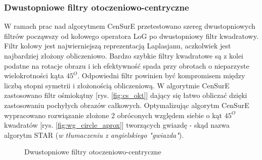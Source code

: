 \subsubsection{Dwustopniowe filtry otoczeniowo-centryczne}

W ramach prac nad algorytmem {CenSurE} przetestowano szereg dwustopniowych filtrów począwszy od kołowego operatora LoG po dwustopniowy filtr kwadratowy. Filtr kołowy jest najwierniejszą reprezentacją Laplasjanu, aczkolwiek jest najbardziej złożony obliczeniowo. Bardzo szybkie filtry kwadratowe są z kolei podatne na rotacje obrazu i ich efektywność spada przy obrotach o nieparzyste wielokrotności kąta $45^O$. Odpowiedni filtr powinien być kompromisem między liczbą stopni symetrii i złożonością obliczeniową. W algorytmie {CenSurE} zastosowano filtr ośmiokątny [rys. \ref{fig:cs_okt}] dający się łatwo obliczać dzięki zastosowaniu pochyłych obrazów całkowych. Optymalizując algorytm {CenSurE} wypracowano rozwiązanie złożone 2 obróconych względem siebie o kąt $45^O$ kwadratów [rys. \ref{fig:wg_circle_aprox}] tworzących gwiazdę - skąd nazwa algorytm STAR (\textit{w tłumaczeniu z angielskiego "gwiazda"}).



\begin{figure}[!htb]
\centering
{}
\caption{Dwustopniowe filtry otoczeniowo-centryczne}
\label{fig:star_bi_filters}
\end{figure}


